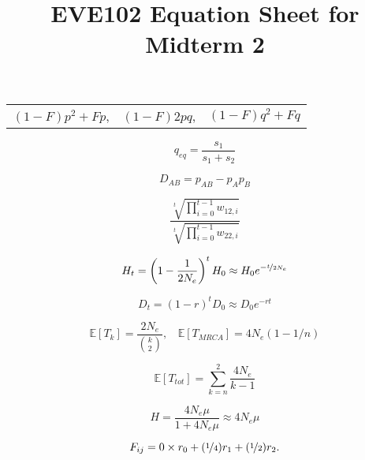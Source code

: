 \documentclass[12pt,twocolumn]{article}
\newcommand{\E}{\mathbb{E}}
\begin{document}
\title{EVE102 Equation Sheet for Midterm 2}
\date{}
\maketitle

\begin{center}
\begin{tabular}{ccc}
$(1-F) p^2 + F p$, & $(1-F) 2pq$, & $(1-F) q^2 + F q$ \nonumber
\end{tabular}
\end{center}

\begin{equation}
q_{eq} = \frac{s_1}{s_1+s_2} \nonumber
\end{equation}

\begin{equation}
D_{AB} = p_{AB} - p_Ap_B \nonumber
\end{equation}

\begin{equation}
	\frac{\sqrt[t]{\prod_{i=0}^{t-1}w_{12,i}}}{\sqrt[t]{\prod_{i=0}^{t-1}w_{22,i}}} \nonumber
\end{equation}

\begin{equation}
  H_t = \left(1-\frac{1}{2N_e} \right)^tH_0 \approx H_0 e^{-\nicefrac{t}{2N_e}} \nonumber
\end{equation}

\begin{equation}
  D_t=  (1-r)^t D_0 \approx D_0 e^{-rt} \nonumber
\end{equation}

\begin{equation}
\E[T_k] = \frac{2 N_e}{ {k \choose 2} },~~~~\E[T_{MRCA}] =
4N_e(1-1/n) \nonumber
\end{equation}

\begin{equation}
\E[T_{tot}] = \sum_{k=n}^2 \frac{4N_e}{k-1}  \nonumber
\end{equation}

\begin{equation}
  H = \frac{4N_e\mu}{1+4N_e\mu} \approx 4N_e\mu  \nonumber
\end{equation}

\begin{equation}
  F_{ij}= 0 \times r_0 + (\nicefrac{1}{4}) r_1  + (\nicefrac{1}{2}) r_2.  \nonumber
\label{eqn:coeffkinship}
\end{equation}
\end{document}
